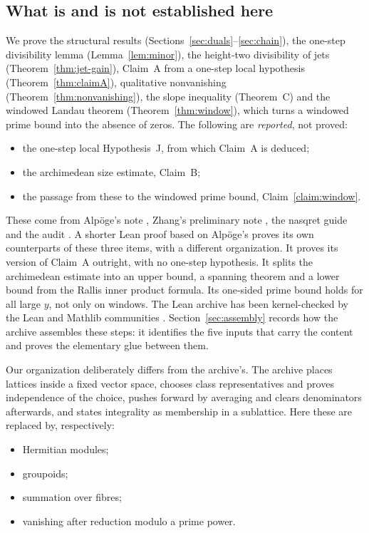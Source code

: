 \documentclass[11pt]{amsart}
\theoremstyle{definition}
\theoremstyle{remark}
\begin{document}
\subsection{What is and is not established here}\label{subsec:status}
We prove the structural results (Sections~\ref{sec:duals}--\ref{sec:chain}), the one-step divisibility lemma (Lemma~\ref{lem:minor}), the height-two divisibility of jets (Theorem~\ref{thm:jet-gain}), Claim~A from a one-step local hypothesis (Theorem~\ref{thm:claimA}), qualitative nonvanishing (Theorem~\ref{thm:nonvanishing}), the slope inequality (Theorem~C) and the windowed Landau theorem (Theorem~\ref{thm:window}), which turns a windowed prime bound into the absence of zeros. The following are \emph{reported}, not proved:
\begin{itemize}
\item the one-step local Hypothesis~J, from which Claim~A is deduced;
\item the archimedean size estimate, Claim~B;
\item the passage from these to the windowed prime bound, Claim~\ref{claim:window}.
\end{itemize}
These come from Alp\"oge's note \cite{Alpoge}, Zhang's preliminary note \cite{Zhang}, the nasqret guide \cite{nasqret} and the audit \cite{golf}. A shorter Lean proof based on Alp\"oge's \cite{grhlean} proves its own counterparts of these three items, with a different organization. It proves its version of Claim~A outright, with no one-step hypothesis. It splits the archimedean estimate into an upper bound, a spanning theorem and a lower bound from the Rallis inner product formula. Its one-sided prime bound holds for all large $y$, not only on windows. The Lean archive has been kernel-checked by the Lean and Mathlib communities \cite{LeanBlog}. Section~\ref{sec:assembly} records how the archive assembles these steps: it identifies the five inputs that carry the content and proves the elementary glue between them.

Our organization deliberately differs from the archive's. The archive places lattices inside a fixed vector space, chooses class representatives and proves independence of the choice, pushes forward by averaging and clears denominators afterwards, and states integrality as membership in a sublattice. Here these are replaced by, respectively:
\begin{itemize}
\item Hermitian modules;
\item groupoids;
\item summation over fibres;
\item vanishing after reduction modulo a prime power.
\end{itemize}
\end{document}
